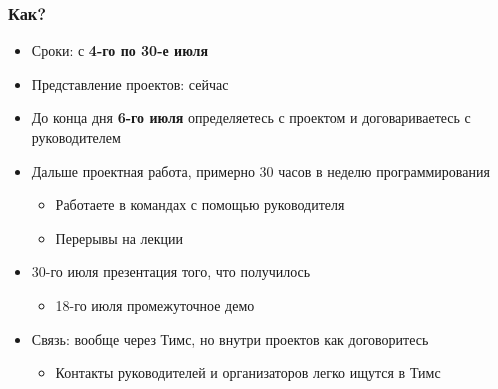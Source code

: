 \documentclass[xetex,mathserif,serif]{beamer}
\begin{document}
    \begin{frame}
        \frametitle{Как?}
        \begin{itemize}
            \item Сроки: с \textbf{4-го по 30-е июля}
            \item Представление проектов: сейчас
            \item До конца дня \textbf{6-го июля} определяетесь с проектом и договариваетесь с руководителем
            \item Дальше проектная работа, примерно 30 часов в неделю программирования
            \begin{itemize}
                \item Работаете в командах с помощью руководителя
                \item Перерывы на лекции
            \end{itemize}
            \item 30-го июля презентация того, что получилось
            \begin{itemize}
                \item 18-го июля промежуточное демо
            \end{itemize}
            \item Связь: вообще через Тимс, но внутри проектов как договоритесь
            \begin{itemize}
                \item Контакты руководителей и организаторов легко ищутся в Тимс
            \end{itemize}
        \end{itemize}
    \end{frame}
\end{document}
